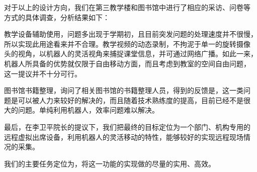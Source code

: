 对于以上的设计方向，我们在第三教学楼和图书馆中进行了相应的采访、问卷等
方式的具体调查，分析结果如下：

教学设备辅助使用，问题多出现于学期初，且目前突发问题的处理速度并不很慢，
所以实现此用途看来并不合理。教学视频的动态录制，不拘泥于单一的旋转摄像
头的视角，以机器人的灵活视角来捕捉课堂信息，并可通过网络广播。如此一来，
机器人所具备的优势就仅限于自由移动方面，而且考虑到教室的空间自由问题，
这一提议并不十分可行。

图书馆书籍整理，询问了相关图书馆的书籍整理人员，得到的反馈是，这一类问
题是可以被人力来较好的解决的，而且随着技术熟练度的提高，目前已经不是很
大的问题。单纯利用机器人，效率问题难以解决。

最后，在李卫平院长的提议下，我们把最终的目标定位为一个部门、机构专用的
远程虚拟出席设备，利用机器人的灵活移动的特性，能够较好的实现远程现场情
况的采集。

我们的主要任务定位为，将这一功能的实现做的尽量的实用、高效。
